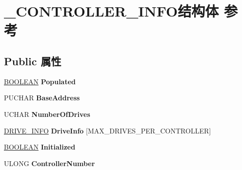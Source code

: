 \hypertarget{struct___c_o_n_t_r_o_l_l_e_r___i_n_f_o}{}\section{\+\_\+\+C\+O\+N\+T\+R\+O\+L\+L\+E\+R\+\_\+\+I\+N\+F\+O结构体 参考}
\label{struct___c_o_n_t_r_o_l_l_e_r___i_n_f_o}
\subsection*{Public 属性}
\begin{DoxyCompactItemize}
\item 
\mbox{\label{struct___c_o_n_t_r_o_l_l_e_r___i_n_f_o_af87206ed69b72a5d2c043b15e33cdd10}} 
\hyperlink{_processor_bind_8h_a112e3146cb38b6ee95e64d85842e380a}{B\+O\+O\+L\+E\+AN} {\bfseries Populated}
\item 
\mbox{\label{struct___c_o_n_t_r_o_l_l_e_r___i_n_f_o_ae5fa7560a3ab134abd5da87c7f95a6b0}} 
P\+U\+C\+H\+AR {\bfseries Base\+Address}
\item 
\mbox{\label{struct___c_o_n_t_r_o_l_l_e_r___i_n_f_o_a3e612b7cb9ed69bbd40d6ae39640780b}} 
U\+C\+H\+AR {\bfseries Number\+Of\+Drives}
\item 
\mbox{\label{struct___c_o_n_t_r_o_l_l_e_r___i_n_f_o_a937f82a2f8b4f4ff6e4f8a2458e939ca}} 
\hyperlink{struct___d_r_i_v_e___i_n_f_o}{D\+R\+I\+V\+E\+\_\+\+I\+N\+FO} {\bfseries Drive\+Info} \mbox{[}M\+A\+X\+\_\+\+D\+R\+I\+V\+E\+S\+\_\+\+P\+E\+R\+\_\+\+C\+O\+N\+T\+R\+O\+L\+L\+ER\mbox{]}
\item 
\mbox{\label{struct___c_o_n_t_r_o_l_l_e_r___i_n_f_o_a3b313b8b73b7249315b17b5048ac93c9}} 
\hyperlink{_processor_bind_8h_a112e3146cb38b6ee95e64d85842e380a}{B\+O\+O\+L\+E\+AN} {\bfseries Initialized}
\item 
\mbox{\label{struct___c_o_n_t_r_o_l_l_e_r___i_n_f_o_afa7cdf98ad713d3bd625d039cdc2d2a8}} 
U\+L\+O\+NG {\bfseries Controller\+Number}
\item 

\end{DoxyCompactItemize}
